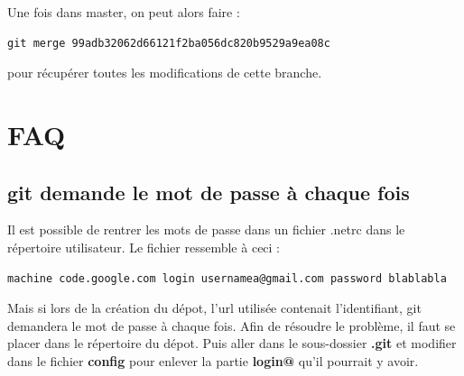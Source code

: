 \documentclass[a4paper,twoside]{article}
\begin{document}
Une fois dans master, on peut alors faire : 
\begin{verbatim}
git merge 99adb32062d66121f2ba056dc820b9529a9ea08c
\end{verbatim}
pour récupérer toutes les modifications de cette branche.

\section{FAQ}
\subsection{git demande le mot de passe à chaque fois}
Il est possible de rentrer les mots de passe dans un fichier .netrc dans le répertoire utilisateur. Le fichier ressemble à ceci :
\begin{verbatim}
machine code.google.com login usernamea@gmail.com password blablabla
\end{verbatim}

Mais si lors de la création du dépot, l'url utilisée contenait l'identifiant, git demandera le mot de passe à chaque fois. Afin de résoudre le problème, il faut se placer dans le répertoire du dépot. Puis aller dans le sous-dossier \textbf{.git} et modifier dans le fichier \textbf{config} pour enlever la partie \textbf{login@} qu'il pourrait y avoir.

\printindex
\end{document}
